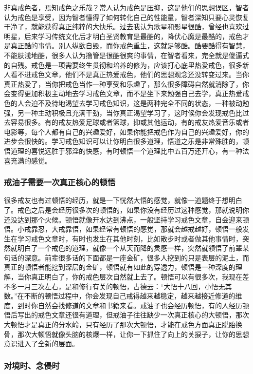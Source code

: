 非真戒色者，焉知戒色之乐哉？常人认为戒色是压抑，这是他们的思想误区，智者认为戒色是享受，因为智者懂得了如何转化自己的性能量，智者深知只要心灵恢复干净了，就能获得真正纯粹的大快乐。过去我认为歌星和影星很酷，曾经也喜欢过明星，后来学习传统文化后才明白圣贤教育是最酷的，降伏心魔是最酷的，戒色才是真正酷的事情。别人纵欲自毁，而你戒色重生，这就足够酷。酷要酷得有智慧，不能肤浅地酷，很多人认为撸管是很酷很爽的事情，在智者看来，完全就是傻逼式的自残。戒色是一项需要终生贯彻和培养的修为，应该打心底里热爱戒色，很多新人看不进戒色文章，他们不是真正热爱戒色，他们的思想观念还没转变过来。当你真正热爱了，当你把戒色当作一种享受和乐趣了，那么很多障碍自然就消除了，你会变得更加积极主动地去学习戒色文章，而不是坐下来勉强自己去学，真正热爱戒色的人会迫不及待地渴望去学习戒色知识，这是两种完全不同的状态，一种被动勉强，另一种主动积极且充满干劲，当你真正渴望学习了，这时候你会发现戒色比过去容易很多。有的戒友热爱足球或者篮球，抑或其他运动，有的戒友热爱音乐或者电影等，每个人都有自己的兴趣爱好，如果你能把戒色作为自己的兴趣爱好，你的进步会很快的。学习戒色知识可以让你明白很多道理，悟道之乐是非常殊胜的，顿悟道理的喜悦远胜于邪淫的快感，有时顿悟一个道理比中五百万还开心，有一种法喜充满的感觉。

\subsubsection{戒油子需要一次真正核心的顿悟}

很多戒友也有过顿悟的经历，就是一下恍然大悟的感觉，就像一道题终于想明白了。戒色之后是会经历很多次的顿悟的，如果你没有经历过这种感觉，那就说明你还没达到那个火候。顿悟就像开水达到沸点，一般坚持学习戒色文章，自会迎来顿悟。小戒靠忍，大戒靠悟，如果经常有顿悟的感觉，那就会越戒越好，顿悟一般发生在学习戒色文章时，有时也发生在其他时刻，比如散步时或者做其他事情时，突然就明白了一个戒色的道理，就像一个从天而降的灵感一样，突然就领悟了前辈某句话的深意。前辈很多话的下面都是一座金矿，很多人挖到的只是表层的泥土，而真正的顿悟者能挖到深层的金矿，顿悟就有如此的穿透力，顿悟是一种深度的理解，当你真正明白了，你的戒色层次自然就上去了。顿悟可以有很多次，我现在差不多一月三次左右，是和修行有关的顿悟，古德云：“大悟十八回，小悟无其数。”在不断的顿悟过程中，你会发现自己戒得越来越稳定，越来越接近修道的维度，到时你自然会找修道的文章和书籍来看。戒油子也会经历顿悟，有的人经历顿悟后写出的戒色文章还很有道理，但戒油子往往缺少一次真正核心的大顿悟，那次大顿悟才是真正的分水岭，只有经历了那次大顿悟，才能在戒色方面真正脱胎换骨，那次大顿悟就像头脑的核爆一样，让你一下抓住了向上的关捩子，让你的思想意识进入了全新的层面。

\subsubsection{对境时、念侵时}

